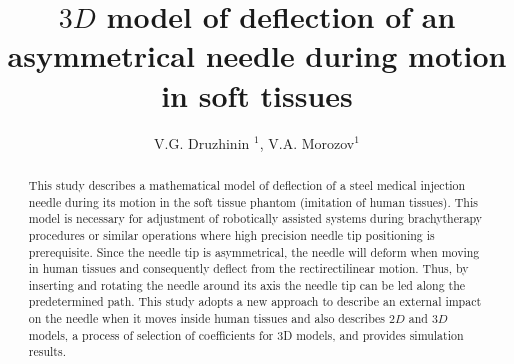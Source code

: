 \documentclass[a4paper]{jpconf}
\begin{document}
\title{$3D$ model of deflection of an asymmetrical needle during motion in soft tissues}

\author{V.G. Druzhinin $^1$, V.A. Morozov$^1$}

\address{$^1$Department of Physical Mechanics, St. Petersburg University, 7/9 Universitetskaya Emb.,St Petersburg 199034, Russia}



\begin{abstract}
This study describes a mathematical model of deflection of a steel medical injection needle during its motion in the soft tissue phantom (imitation of human tissues). This model is necessary for adjustment of robotically assisted systems during brachytherapy procedures or similar operations where high precision needle tip positioning is prerequisite. Since the needle tip is asymmetrical, the needle will deform when moving in human tissues and consequently deflect from the rectirectilinear motion. Thus, by inserting and rotating the needle around its axis the needle tip can be led along the predetermined path. This study adopts a new approach to describe an external impact on the needle when it moves inside human tissues and also describes $2D$ and $3D$ models, a process of selection of coefficients for 3D models, and provides simulation results.
\end{abstract}
\end{document}
